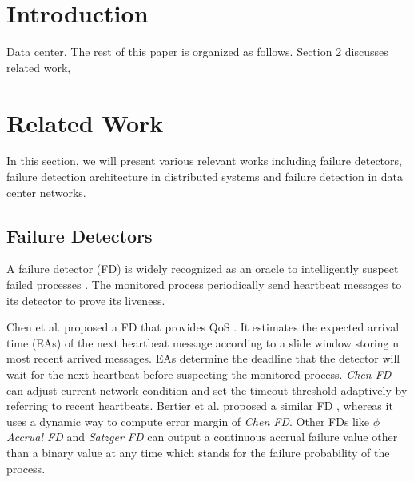 \documentclass{sig-alternate-05-2015}
\begin{document}


%
%

%
%
\printccsdesc



\section{Introduction}
Data center.
The rest of this paper is organized as follows. Section 2 discusses related work,

\section{Related Work}
In this section, we will present various relevant works including failure detectors, failure detection architecture in distributed systems and failure detection in data center networks.

\subsection{Failure Detectors}
A failure detector (FD) is widely recognized as an oracle to intelligently suspect failed processes \cite{chandra1996unreliable}. The monitored process periodically send heartbeat messages to its detector to prove its liveness.

Chen et al. proposed a FD that provides QoS \cite{chen2002quality}. It estimates the expected arrival time (EAs) of the next heartbeat message according to a slide window storing n most recent arrived messages. EAs determine the deadline that the detector will wait for the next heartbeat before suspecting the monitored process. \textit{Chen FD} can adjust current network condition and set the timeout threshold adaptively by referring to recent heartbeats. Bertier et al. proposed a similar FD \cite{bertier2002implementation}, whereas it uses a dynamic way to compute error margin of \textit{Chen FD}. Other FDs like \textit{$\phi$ Accrual FD} \cite{hayashibara2004varphi} and \textit{Satzger FD} \cite{satzger2007new} can output a continuous accrual failure value other than a binary value at any time which stands for the failure probability of the process.
\end{document}

